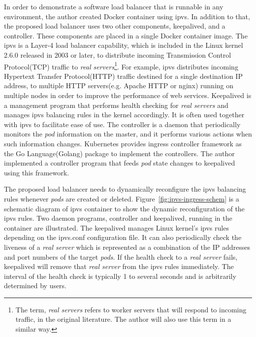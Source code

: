 In order to demonstrate a software load balancer that is runnable in any environment, the author created Docker container using ipvs.
In addition to that, the proposed load balancer uses two other components, keepalived, and a controller.
These components are placed in a single Docker container image.
The ipvs is a Layer-4 load balancer capability, which is included in the Linux kernel 2.6.0 released in 2003 or later,
to distribute incoming Transmission Control Protocol(TCP) traffic to
{\em real servers}\footnote{The term, {\em real servers} refers to worker servers that will respond to incoming traffic,
in the original literature\cite{Zhang2000}. The author will also use this term in a similar way.}\cite{Zhang2000}.
For example, ipvs distributes incoming Hypertext Transfer Protocol(HTTP) traffic destined for a single destination IP address,
to multiple HTTP servers(e.g. Apache HTTP or nginx) running on multiple nodes in order to improve the performance of web services.
Keepalived is a management program that performs health checking for {\em real servers}
and manages ipvs balancing rules in the kernel accordingly.
It is often used together with ipvs to facilitate ease of use.
The controller is a daemon that periodically monitors the {\em pod} information on the master,
and it performs various actions when such information changes.
Kubernetes provides ingress controller framework as the Go Language(Golang) package to implement the controllers.
The author implemented a controller program that feeds {\em pod} state changes to keepalived
using this framework.

The proposed load balancer needs to dynamically reconfigure the ipvs balancing rules whenever {\em pods} are created or deleted. 
Figure~\ref{fig:ipvs-ingress-schem} is a schematic diagram of ipvs container to show the dynamic reconfiguration of the ipvs rules.
Two daemon programs, controller and keepalived, running in the container are illustrated.
The keepalived manages Linux kernel's ipvs rules depending on the ipvs.conf configuration file.
It can also periodically check the liveness of a {\em real server}
%
which is represented as a combination of the IP addresses and port numbers of the target {\em pods}. 
If the health check to a {\em real server} fails, keepalived will remove that {\em real server} from the ipvs rules immediately.
The interval of the health check is typically 1 to several seconds and is arbitrarily determined by users.  

